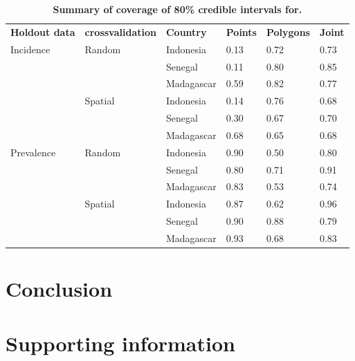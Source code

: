 \documentclass[10pt,letterpaper]{article}
\newlength\savedwidth
\newcommand\thickhline{\noalign{\global\savedwidth\arrayrulewidth\global\arrayrulewidth 2pt}%
\hline
\noalign{\global\arrayrulewidth\savedwidth}}
\begin{document}
\begin{table}[!ht]
\begin{adjustwidth}{-2.25in}{0in} %
\centering
\caption{
{\bf Summary of coverage of 80\% credible intervals for.}}
\begin{tabular}{llllll}
\hline
{\bf Holdout data} & {\bf crossvalidation} & {\bf Country} &  {\bf Points} & {\bf Polygons} & {\bf Joint} \\
\thickhline 
Incidence & Random & Indonesia & 0.13 & 0.72 &  0.73\\
&& Senegal & 0.11 & 0.80 &  0.85\\
&& Madagascar & 0.59 & 0.82 &  0.77\vspace{1mm}\\
& Spatial & Indonesia & 0.14 & 0.76 &  0.68\\
&& Senegal & 0.30 & 0.67 &  0.70\\
&& Madagascar & 0.68 & 0.65 &  0.68\vspace{3mm} \\
Prevalence & Random & Indonesia & 0.90 & 0.50 &  0.80\\
&& Senegal & 0.80 & 0.71 &  0.91\\
&& Madagascar & 0.83 & 0.53 &  0.74\vspace{1mm}\\
& Spatial & Indonesia & 0.87 & 0.62 &  0.96\\
&& Senegal & 0.90 & 0.88 &  0.79\\
&& Madagascar & 0.93 & 0.68 &  0.83\\
\end{tabular}
\begin{flushleft}

\end{flushleft}
\label{table3}
\end{adjustwidth}
\end{table}

\section*{Conclusion}





\section*{Supporting information}
\end{document}

